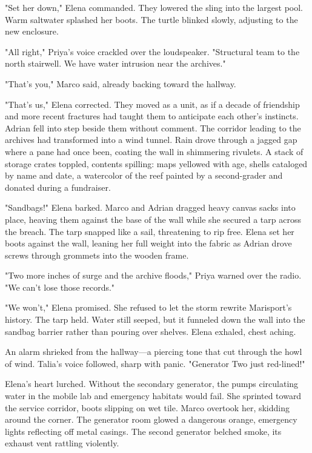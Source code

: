 "Set her down," Elena commanded. They lowered the sling into the largest pool. Warm saltwater splashed her boots. The turtle blinked slowly, adjusting to the new enclosure.

"All right," Priya's voice crackled over the loudspeaker. "Structural team to the north stairwell. We have water intrusion near the archives."

"That's you," Marco said, already backing toward the hallway.

"That's us," Elena corrected. They moved as a unit, as if a decade of friendship and more recent fractures had taught them to anticipate each other's instincts. Adrian fell into step beside them without comment. The corridor leading to the archives had transformed into a wind tunnel. Rain drove through a jagged gap where a pane had once been, coating the wall in shimmering rivulets. A stack of storage crates toppled, contents spilling: maps yellowed with age, shells cataloged by name and date, a watercolor of the reef painted by a second-grader and donated during a fundraiser.

"Sandbags!" Elena barked. Marco and Adrian dragged heavy canvas sacks into place, heaving them against the base of the wall while she secured a tarp across the breach. The tarp snapped like a sail, threatening to rip free. Elena set her boots against the wall, leaning her full weight into the fabric as Adrian drove screws through grommets into the wooden frame.

"Two more inches of surge and the archive floods," Priya warned over the radio. "We can't lose those records."

"We won't," Elena promised. She refused to let the storm rewrite Marisport's history. The tarp held. Water still seeped, but it funneled down the wall into the sandbag barrier rather than pouring over shelves. Elena exhaled, chest aching.

An alarm shrieked from the hallway—a piercing tone that cut through the howl of wind. Talia's voice followed, sharp with panic. "Generator Two just red-lined!"

Elena's heart lurched. Without the secondary generator, the pumps circulating water in the mobile lab and emergency habitats would fail. She sprinted toward the service corridor, boots slipping on wet tile. Marco overtook her, skidding around the corner. The generator room glowed a dangerous orange, emergency lights reflecting off metal casings. The second generator belched smoke, its exhaust vent rattling violently.

